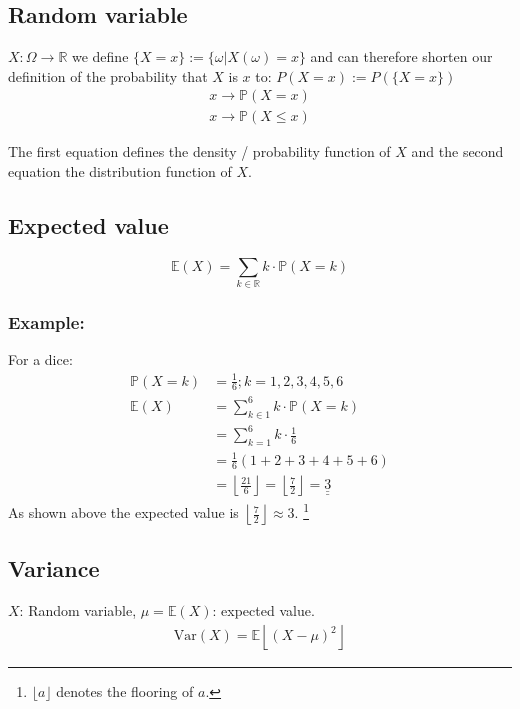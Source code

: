 \documentclass[twoside, a4paper, twocolumn]{article}
\begin{document}
    \subsection{Random variable}
    $X: \Omega \rightarrow \mathbb{R}$ we define $\{X = x\} := \{\omega |
    X(\omega) = x\}$ and can therefore shorten our definition of the
    probability that $X$ is $x$ to: $P(X = x) := P(\{X = x\})$
    \begin{eqnarray}
        x \rightarrow \mathbb{P}(X = x) \\
        x \rightarrow \mathbb{P}(X \leq x)
    \end{eqnarray}

    The first equation defines the density / probability function of $X$ and the
    second equation the distribution function of $X$.

    \subsection{Expected value}
    \begin{equation}
        \mathbb{E}(X) = \sum_{k \in \mathbb{R}}k \cdot \mathbb{P}(X = k)
    \end{equation}

    \subsubsection{Example:}
    For a dice:
    \begin{align*}
        \mathbb{P}(X = k) &= \frac{1}{6}; k = 1,2,3,4,5,6 \\
        \mathbb{E}(X) &= \sum_{k \in 1}^6 k \cdot \mathbb{P}(X = k) \\
                      &= \sum_{k = 1}^6 k \cdot \frac{1}{6} \\
                      &= \frac{1}{6} (1+2+3+4+5+6) \\
                      &= \left\lfloor\frac{21}{6}\right\rfloor =
                      \left\lfloor\frac{7}{2}\right\rfloor = \underline{\underline{3}}
    \end{align*}
    As shown above the expected value is $\left\lfloor\frac{7}{2}\right\rfloor\approx 3$.
    \footnote{$\lfloor a \rfloor$ denotes the flooring of $a$.}

    \subsection{Variance}
    $X$: Random variable, $\mu = \mathbb{E}(X)$: expected value.
    \begin{eqnarray}
        \textrm{Var}(X) = \mathbb{E}\left\lfloor(X -
        \mu)^2\right\rfloor
    \end{eqnarray}
\end{document}
